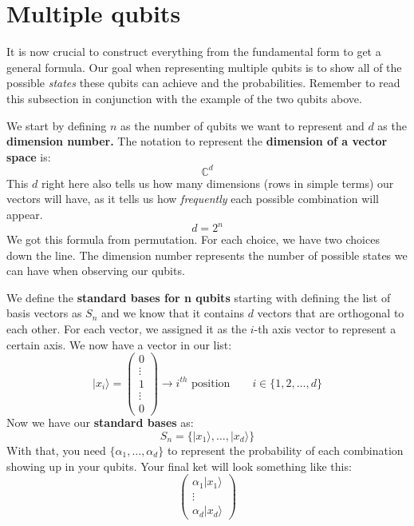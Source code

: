 \section{Multiple qubits}
It is now crucial to construct everything from the fundamental form to get a general formula. Our goal when representing multiple qubits is to show all of the possible \textit{states} these qubits can achieve and the probabilities. Remember to read this subsection in conjunction with the example of the two qubits above. 

We start by defining $n$ as the number of qubits we want to represent and $d$ as the \textbf{dimension number.} The notation to represent the \textbf{dimension of a vector space} is:
\begin{equation}
    \mathbb{C}^d
\end{equation}
This $d$ right here also tells us how many dimensions (rows in simple terms) our vectors will have, as it tells us how \textit{frequently} each possible combination will appear.
\begin{equation} d = 2^n \end{equation}
We got this formula from permutation. For each choice, we have two choices down the line. The dimension number represents the number of possible states we can have when observing our qubits.

We define the \textbf{standard bases for n qubits} starting with defining the list of basis vectors as $S_n$ and we know that it contains $d$ vectors that are orthogonal to each other. For each vector, we assigned it as the $i$-th axis vector to represent a certain axis. We now have a vector in our list:
\begin{equation}
    |x_i\rangle
    = \begin{pmatrix}0 \\ \vdots \\ 1 \\ \vdots \\ 0 \end{pmatrix}
    \rightarrow i^{th}\text{ position}
    \qquad
    i \in \{1,2,\dots,d\}
\end{equation}
Now we have our \textbf{standard bases} as:
\begin{equation}
    S_n = \{ |x_1\rangle, \dots, |x_d\rangle \}
\end{equation}
With that, you need $\{\alpha_1,\dots,\alpha_d\}$ to represent the probability of each combination showing up in your qubits. Your final ket will look something like this:
\[\begin{pmatrix}
    \alpha_1|x_1\rangle \\
    \vdots \\
    \alpha_d|x_d\rangle
\end{pmatrix}\]

